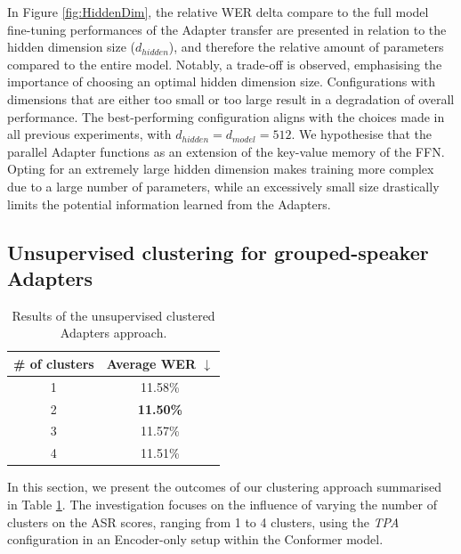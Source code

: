 In Figure \ref{fig:HiddenDim}, the relative \ac{WER} delta compare to the full model fine-tuning performances of the Adapter transfer are presented in relation to the hidden dimension size ($d_{hidden}$), and therefore the relative amount of parameters compared to the entire model. Notably, a trade-off is observed, emphasising the importance of choosing an optimal hidden dimension size. Configurations with dimensions that are either too small or too large result in a degradation of overall performance. The best-performing configuration aligns with the choices made in all previous experiments, with $d_{hidden} = d_{model} = 512$. We hypothesise that the parallel Adapter functions as an extension of the key-value memory of the \ac{FFN}. Opting for an extremely large hidden dimension makes training more complex due to a large number of parameters, while an excessively small size drastically limits the potential information learned from the Adapters. 

\subsection{Unsupervised clustering for grouped-speaker Adapters}
\label{sec:clustering_emb}
\begin{table}[t]
    \begin{center}    
    \begin{tabular}{cc}
    \hline
      \# of clusters & Average WER $\downarrow$    \\ \hline
    \multicolumn{1}{c}{1} & 11.58\%  \\%
    \multicolumn{1}{c}{2} & \textbf{11.50\%}  \\
    \multicolumn{1}{c}{3} & 11.57\%  \\
    \multicolumn{1}{c}{4} & 11.51\%  \\ \hline 
    \end{tabular}
    \end{center}
    \caption{Results of the unsupervised clustered Adapters approach.}
    \label{tab:res_clusters}
    \end{table}


In this section, we present the outcomes of our clustering approach summarised in Table \ref{tab:res_clusters}. The investigation focuses on the influence of varying the number of clusters on the \ac{ASR} scores, ranging from 1 to 4 clusters, using the \textit{\ac{TPA}} configuration in an Encoder-only setup within the Conformer model.

